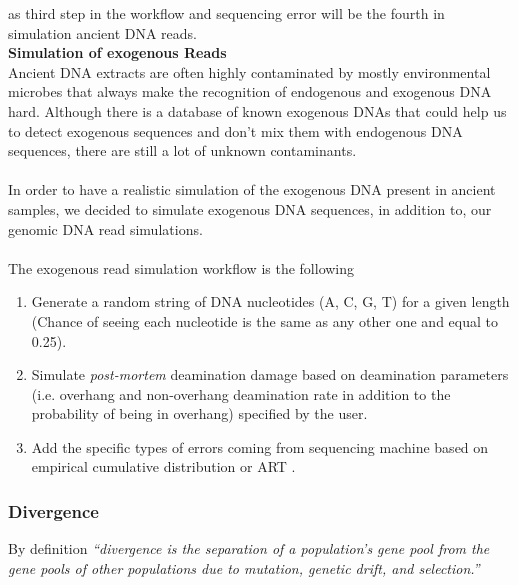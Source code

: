 \documentclass[11pt,a4paper]{report}
\newcommand{\quotes}[1]{``#1''}
\begin{document}
as third step in the workflow and sequencing error will be
the fourth in simulation ancient DNA reads.\\

\textbf{Simulation of exogenous Reads }\\

Ancient DNA extracts are often highly contaminated by mostly environmental 
microbes that always make the recognition of endogenous and exogenous DNA 
hard. Although there is a database of known exogenous DNAs that could help 
us to detect exogenous sequences and don't mix them with endogenous DNA 
sequences, there are still a lot of unknown contaminants.
\\\\
In order to have a realistic simulation of the exogenous DNA present in ancient
samples, we decided to simulate exogenous DNA sequences, in addition to, our 
genomic DNA read simulations.
\\\\
The exogenous read simulation workflow is the following 

\begin{enumerate}

 \item Generate a random string of DNA nucleotides (A, C, G, T) 
 for a given length (Chance of seeing each nucleotide is the same as any
  other one and equal to 0.25).

\item Simulate \emph{post-mortem} deamination damage based on deamination
 parameters (i.e. overhang and non-overhang deamination rate in addition to 
 the probability of being in overhang) specified by the user. 

 \item Add the specific types of errors coming from sequencing machine 
 based on empirical cumulative distribution or ART\cite{art} .

\end{enumerate}





\subsubsection{Divergence} \label{Divergence}

By definition \emph{\quotes{divergence is the separation
of a population's gene pool from the gene pools of other populations 
due to mutation, genetic drift, and selection\cite{divergence1}.}}
\end{document}
